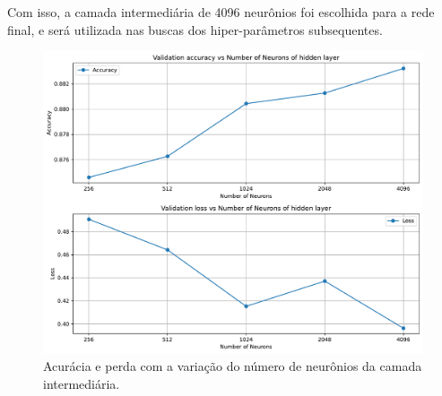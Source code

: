 Com isso, a camada intermediária de 4096 neurônios foi escolhida para a rede final, e será utilizada nas buscas dos hiper-parâmetros subsequentes.




\begin{figure}[H]
	\centering
	\includegraphics[width=0.75\linewidth]{../../plot/mlp/search_neurons}
	\caption{Acurácia e perda com a variação do número de neurônios da camada intermediária.}
	\label{fig:search_neurons}
\end{figure}

